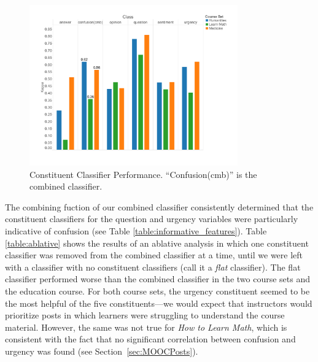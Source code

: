 \documentclass{edm_template}
\begin{document}
\begin{figure}[]
       \centering
       \includegraphics[width=0.8\textwidth]{../Figs/classifierEvalsWithEdu.pdf}
       \caption{\textnormal{Constituent Classifier Performance. ``Confusion(cmb)'' is the combined classifier.}}
      \label{figure:constituents}
\end{figure}

The combining fuction of our combined classifier consistently determined that the constituent classifiers for the question and urgency variables were particularly indicative of confusion (see Table \ref{table:informative_features}). Table \ref{table:ablative} shows the results of an ablative analysis in which one constituent classifier was removed from the combined classifier at a time, until we were left with a classifier with no constituent classifiers (call it a \emph{flat} classifier). The flat classifier performed worse than the combined classifier in the two course sets and the education course. For both course sets, the urgency constituent seemed to be the most helpful of the five constituents---we would expect that instructors would prioritize posts in which learners were struggling to understand the course material. However, the same was not true for \emph{How to Learn Math}, which is consistent with the fact that no significant correlation between confusion and urgency was found (see Section~\ref{sec:MOOCPosts}).
\end{document}
